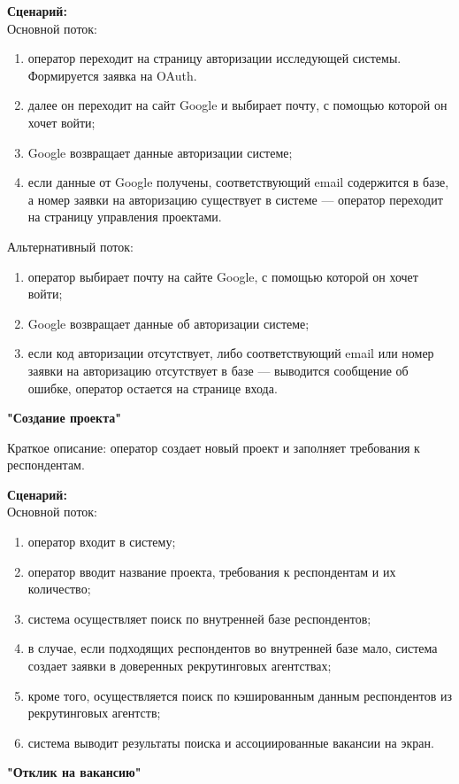 \textbf{Сценарий:}\\
Основной поток:
\begin{enumerate}
\item оператор переходит на страницу авторизации исследующей системы. Формируется заявка на OAuth.
\item далее он переходит на сайт Google и выбирает почту, с помощью которой он хочет войти;
\item Google  возвращает данные авторизации системе;
\item если данные от Google получены, соответствующий email содержится в базе, а номер заявки на авторизацию существует в системе — оператор переходит на страницу управления проектами.
\end{enumerate}
Альтернативный поток:
\begin{enumerate}
\item оператор выбирает почту на сайте Google, с помощью которой он хочет войти;
\item Google возвращает данные об авторизации системе;
\item если код авторизации отсутствует, либо соответствующий email или номер заявки на авторизацию отсутствует в базе — выводится сообщение об ошибке, оператор остается на странице входа.
\end{enumerate}

\textbf{"Создание проекта"}

Краткое описание: оператор создает новый проект и заполняет требования к респондентам.

\textbf{Сценарий:}\\
Основной поток:
\begin{enumerate}
\item оператор входит в систему;
\item оператор вводит название проекта, требования к респондентам и их количество;
\item система осуществляет поиск по внутренней базе респондентов;
\item в случае, если подходящих респондентов во внутренней базе мало, система создает заявки в доверенных рекрутинговых агентствах;
\item кроме того, осуществляется поиск по кэшированным данным респондентов из рекрутинговых агентств;
\item система выводит результаты поиска и ассоциированные вакансии на экран.
\end{enumerate} 

\textbf{"Отклик на вакансию"}

